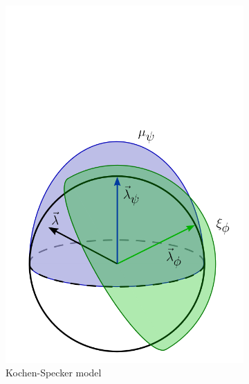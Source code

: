 \documentclass[%
 reprint, onecolumn, 12pt,
superscriptaddress,
nofootinbib,
 prx, 
]{quantumarticle}
\begin{document}
\begin{figure}[t]
  \centering
 \begin{subfigure}[t]{0.24\textwidth}
 \includegraphics[width=\textwidth]{KS_model_v2.png}
 \caption{Kochen-Specker model}
 \label{fig:KSmodel}
 \end{subfigure}
 \begin{subfigure}[t]{0.24\textwidth}

\end{subfigure}
\end{figure}
\end{document}
